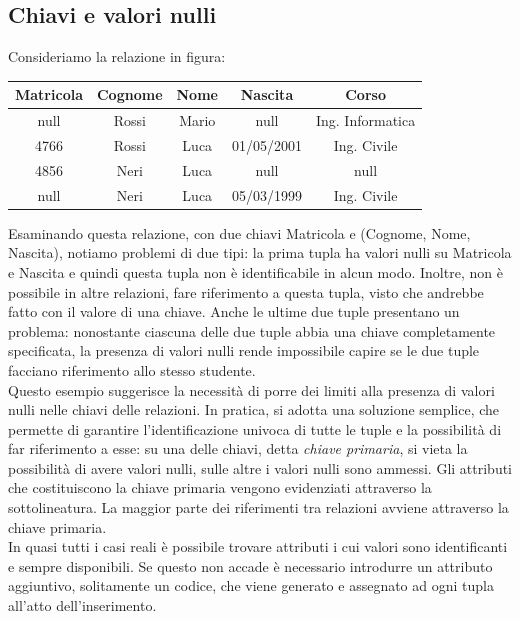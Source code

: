 \documentclass[12pt]{report}
\begin{document}
 	\subsection{Chiavi e valori nulli}
 	Consideriamo la relazione in figura:
 	\begin{center}
 		\begin{tabular}{|c|c|c|c|c|}
 			\hline
 			\textbf{Matricola} & \textbf{Cognome} & \textbf{Nome} & \textbf{Nascita} & \textbf{Corso} \\
 			\hline
 			null & Rossi & Mario & null & Ing. Informatica \\
 			4766 & Rossi & Luca & 01/05/2001 & Ing. Civile \\
 			4856 & Neri & Luca & null & null \\
 			null & Neri & Luca & 05/03/1999 & Ing. Civile \\
 			\hline
 		\end{tabular}
 	\end{center}
 	Esaminando questa relazione, con due chiavi Matricola e (Cognome, Nome, Nascita), notiamo problemi di due tipi: la prima tupla ha valori nulli su Matricola e Nascita e quindi questa tupla non è identificabile in alcun modo. Inoltre, non è possibile in altre relazioni, fare riferimento a questa tupla, visto che andrebbe fatto con il valore di una chiave. Anche le ultime due tuple presentano un problema: nonostante ciascuna delle due tuple abbia una chiave completamente specificata, la presenza di valori nulli rende impossibile capire se le due tuple facciano riferimento allo stesso studente. \\
 	Questo esempio suggerisce la necessità di porre dei limiti alla presenza di valori nulli nelle chiavi delle relazioni. In pratica, si adotta una soluzione semplice, che permette di garantire l'identificazione univoca di tutte le tuple e la possibilità di far riferimento a esse: su una delle chiavi, detta \textit{chiave primaria}, si vieta la possibilità di avere valori nulli, sulle altre i valori nulli sono ammessi. Gli attributi che costituiscono la chiave primaria vengono evidenziati attraverso la sottolineatura. La maggior parte dei riferimenti tra relazioni avviene attraverso la chiave primaria. \\
 	In quasi tutti i casi reali è possibile trovare attributi i cui valori sono identificanti e sempre disponibili. Se questo non accade è necessario introdurre un attributo aggiuntivo, solitamente un codice, che viene generato e assegnato ad ogni tupla all'atto dell'inserimento.
\end{document}
